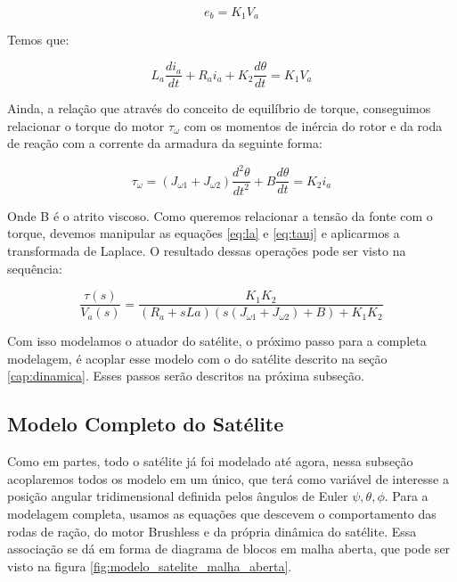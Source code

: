 \begin{equation}
  e_b = K_1V_a
\end{equation}

Temos que:

\begin{equation}\label{eq:la}
L_a \frac{di_a}{dt}+R_a i_a + K_2\frac{d\theta}{dt} = K_1V_a
\end{equation}

Ainda, a relação que através do conceito de equilíbrio de torque, conseguimos relacionar o torque do motor $\tau_{\omega}$ com os momentos de inércia do rotor e da roda de reação com a corrente da armadura da seguinte forma:

\begin{equation}\label{eq:tauj}
\tau_{\omega} = (J_{\omega 1} + J_{\omega 2})\frac{d^{2}\theta}{dt^{2}}+B\frac{d\theta}{dt} = K_2 i_a
\end{equation}

Onde B é o atrito viscoso. Como queremos relacionar a tensão da fonte com o torque, devemos manipular as equações \ref{eq:la} e \ref{eq:tauj} e aplicarmos a transformada de Laplace. O resultado dessas operações pode ser visto na sequência: 

\begin{equation}
  \frac{\tau(s)}{V_a(s)} = \frac{K_1K_2}{(R_a+ sLa)(s(J_{\omega 1} + J_{\omega 2})+B)+K_1K_2}  
\end{equation}

Com isso modelamos o atuador do satélite, o próximo passo para a completa modelagem, é acoplar esse modelo com o do satélite descrito na seção \ref{cap:dinamica}. Esses passos serão descritos na próxima subseção.

\subsection{Modelo Completo do Satélite}

Como em partes, todo o satélite já foi modelado até agora, nessa subseção acoplaremos todos os modelo em um único, que terá como variável de interesse a posição angular tridimensional definida pelos ângulos de Euler $\psi, \theta, \phi$. Para a modelagem completa, usamos as equações que descevem o comportamento das rodas de ração, do motor Brushless e da própria dinâmica do satélite. Essa associação se dá em forma de diagrama de blocos em malha aberta, que pode ser visto na figura \ref{fig:modelo_satelite_malha_aberta}.

